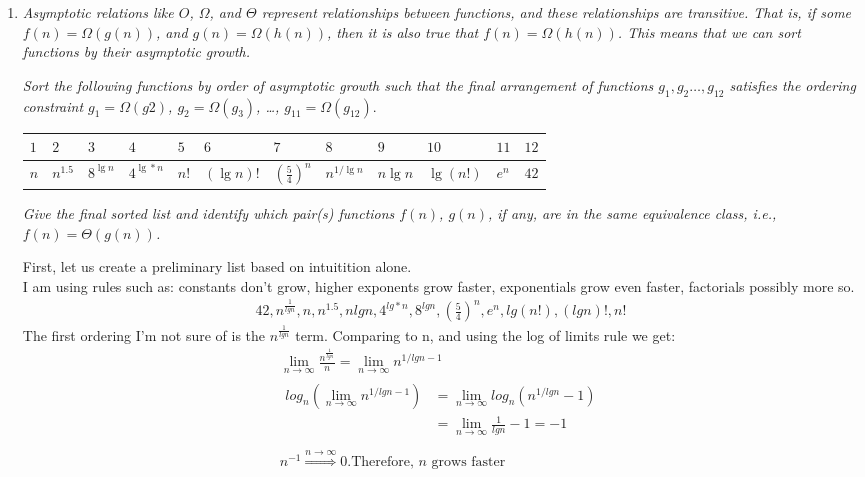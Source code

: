 \documentclass[12pt]{article}
\begin{document}
\begin{enumerate}
\begin{enumerate}
	\end{enumerate}

	\newpage
       \item \textit{Asymptotic relations like $O$, $\Omega$, and $\Theta$ represent relationships between functions, and these relationships are transitive. That is, if some $f(n) = \Omega(g(n))$, and $g(n) = \Omega(h(n))$, then it is also true that $f(n) =  \Omega(h(n))$. This means that we can sort functions by their asymptotic growth.\footnotemark}

     \textit{Sort the following functions by order of asymptotic growth such that the final arrangement of functions $g_1,g_2 \dots,g_{12}$ satisfies the ordering constraint $g_1 = \Omega(g2)$, $g_2 = \Omega(g_3)$, \dots , $g_{11}=\Omega(g_{12})$}.


     \begin{tabular}{|l|l|l|l|l|l|l|l|l|l|l|l|}
     	\hline
     	$1$&
     	$2$&
     	$3$&
     	$4$&
     	$5$&
     	$6$&
     	$7$&
     	$8$&
    	$9$&
     	$10$&
    	$11$&
     	$12$\\
     \hline
      $n$ &
      $n^{1.5}$  &
      $8^{\lg n}$ &
      $4^{\lg* n}$  &
      $n!$  &
      $(\lg n)!$ &
      $(\frac{5}{4})^n$ &
      $n^{1/ \lg n}$ &
      $n \lg n$ &
      $\lg(n!)$ &
      $e^n$ &
      $42$ \\
     \hline
     \end{tabular}

      \textit{Give the final sorted list and identify which pair(s) functions $f(n)$, $g(n)$, if any, are in the same equivalence class, i.e., $f(n) = \Theta(g(n))$.}

        First, let us create a preliminary list based on intuitition alone.\\
        I am using rules such as: constants don't grow, higher exponents grow faster, exponentials grow even faster, factorials possibly more so.\\
        \begin{gather*}
        42, n^\frac{1}{lgn}, n , n^{1.5}, nlgn, 4^{lg*n}, 8^{lgn}, \left(\frac{5}{4}\right)^n, e^n, lg(n!), (lgn)!, n!
        \end{gather*}
The first ordering I'm not sure of is the $n^{\frac{1}{lgn}}$ term. Comparing to n, and using the log of limits rule we get:\\
\begin{gather*}
\lim\limits_{n\to\infty}\frac{n^{\frac{1}{lgn}}}{n} = \lim\limits_{n\to\infty}n^{1/lgn - 1} \\
\begin{align*}
log_n \left(\lim\limits_{n\to\infty}n^{1/lgn - 1}\right) &= \lim\limits_{n\to\infty}log_n(n^{1/lgn} - 1)\\
&= \lim\limits_{n\to\infty}\frac{1}{lgn} - 1 = -1\\
\end{align*}\\
n^{-1} \stackrel{n \to \infty}{\Longrightarrow} 0. \text{Therefore, $n$ grows faster}
\end{gather*}


\end{enumerate}
\end{document}
